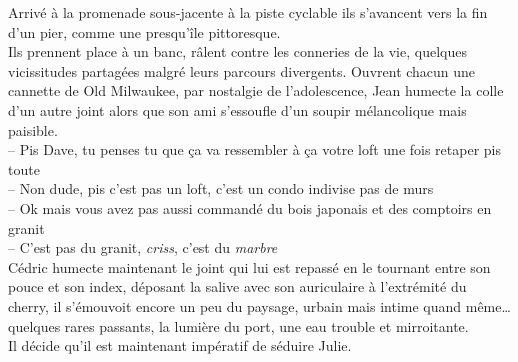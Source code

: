 Arrivé à la promenade sous-jacente à la piste cyclable ils s'avancent vers la
fin d'un pier, comme une presqu'île pittoresque. \\
Ils prennent place à un banc, râlent contre les conneries de la vie, quelques
vicissitudes partagées malgré leurs parcours divergents. Ouvrent chacun une 
cannette de Old Milwaukee, par nostalgie de l'adolescence, Jean humecte
la colle d'un autre joint alors que son ami s'essoufle d'un soupir mélancolique
mais paisible.\\
-- Pis Dave, tu penses tu que ça va ressembler à ça votre loft une fois
retaper pis toute\\
-- Non dude, pis c'est pas un loft, c'est un condo indivise pas de murs\\
-- Ok mais vous avez pas aussi commandé du bois japonais et des comptoirs en granit\\
-- C'est pas du granit, \emph{criss}, c'est du \emph{marbre}\\

Cédric humecte maintenant le joint qui lui est repassé en le tournant entre son
pouce et son index, déposant la salive avec son auriculaire à l'extrémité du cherry,
il s'émouvoit encore un peu du paysage, urbain mais intime quand même\ldots quelques rares
passants, la lumière du port, une eau trouble et mirroitante.\\
Il décide qu'il est maintenant impératif de séduire Julie.



